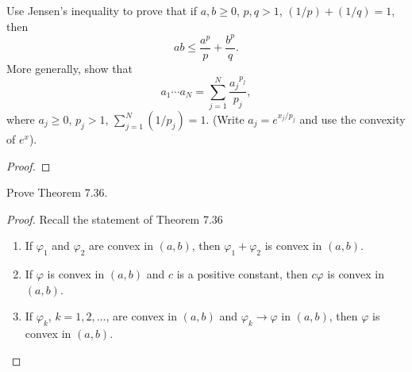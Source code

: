 \begin{problem}
Use Jensen's inequality to prove that if $a,b\geq 0$, $p,q>1$,
$(1/p)+(1/q)=1$, then
\[
ab\leq\frac{a^p}{p}+\frac{b^p}{q}.
\]
More generally, show that
\[
a_1\dotsm a_N=\sum_{j=1}^N\frac{{a_j}^{p_j}}{p_j},
\]
where $a_j\geq 0$, $p_j>1$, $\sum_{j=1}^N(1/p_j)=1$. (Write
$a_j=e^{x_j/p_j}$ and use the convexity of $e^x$).
\end{problem}
\begin{proof}
\end{proof}
\newpage

\begin{problem}
Prove Theorem 7.36.
\end{problem}
\begin{proof}
Recall the statement of Theorem 7.36
\begin{theorem*}
\begin{enumerate}[label=\textnormal{(\roman*)}]
\item If $\varphi_1$ and $\varphi_2$ are convex in $(a,b)$, then
  $\varphi_1+\varphi_2$ is convex in $(a,b)$.
\item If $\varphi$ is convex in $(a,b)$ and $c$ is a positive constant,
  then $c\varphi$ is convex in $(a,b)$.
\item If $\varphi_k$, $k=1,2,\dotsc$, are convex in $(a,b)$ and
  $\varphi_k\to\varphi$ in $(a,b)$, then $\varphi$ is convex in $(a,b)$.
\end{enumerate}
\end{theorem*}
\end{proof}


